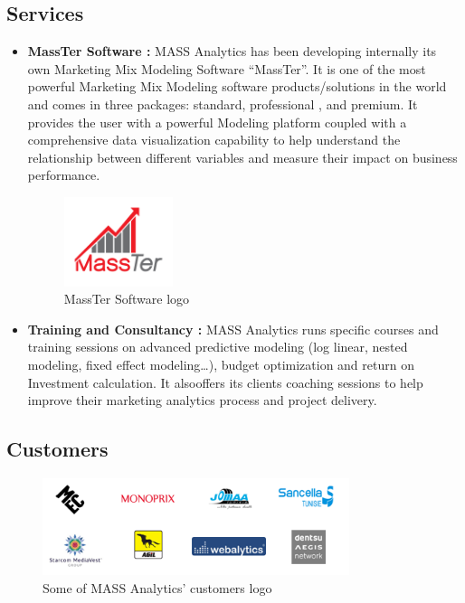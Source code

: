 \documentclass[12pt]{article}
\begin{document}
	\subsection{Services}
	\begin{itemize}
		\item \textbf{MassTer Software :} MASS Analytics has been developing internally its own Marketing Mix Modeling Software ``MassTer''. It is one of the most powerful Marketing Mix Modeling software products/solutions in the world and comes in three packages: standard, professional , and premium. It provides the user with a powerful Modeling platform coupled with a comprehensive data visualization capability to help understand the relationship between different variables and measure their impact on business performance.
			\begin{figure}[h]
			\centering
			\includegraphics[width=0.3\textwidth]{massTer_logo.png}
			\caption{MassTer Software logo}
		\end{figure}
		
		\item \textbf{Training and Consultancy :} MASS Analytics runs specific courses and training sessions on advanced predictive modeling (log linear, nested modeling, fixed effect modeling…), budget optimization and return on Investment calculation. It alsooffers its clients coaching sessions to help improve their marketing analytics process and project delivery.
	\end{itemize}
\vspace{66mm}
	\subsection{Customers}
	
		\begin{figure}[h]
		\centering
		\includegraphics[width=0.8\textwidth]{customers_logo.png}
		\caption{Some of MASS Analytics’ customers logo}
	\end{figure}
\end{document}
